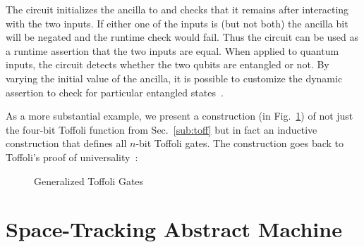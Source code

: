 \documentclass[sigplan,10pt,review,anonymous]{acmart}
\begin{document}
\begin{figure}
  
\end{figure}
\PIFDparity{}

\noindent The circuit initializes the ancilla to  and
checks that it remains  after interacting with the two
inputs. If either one of the inputs is  (but not both)
the ancilla bit will be negated and the runtime check would fail. Thus
the circuit can be used as a runtime assertion that the two inputs are
equal. When applied to quantum inputs, the circuit detects whether the
two qubits are entangled or not. By varying the initial value of the
ancilla, it is possible to customize the dynamic assertion to check
for particular entangled states~\cite{DBLP:journals/cal/ZhouB19}.

As a more substantial example, we present a construction (in
Fig.~\ref{fig:toff}) of not just the four-bit Toffoli function from
Sec.~\ref{sub:toff} but in fact an inductive construction that defines
all $n$-bit Toffoli gates. The construction goes back to Toffoli's
proof of universality~\cite{Toffoli:1980}:

\begin{figure}[ht]
  \PIFDtoffoli{}
\caption{\label{fig:toff}Generalized Toffoli Gates}
\end{figure}

\section{Space-Tracking Abstract Machine}
\label{sec:space}
\end{document}
